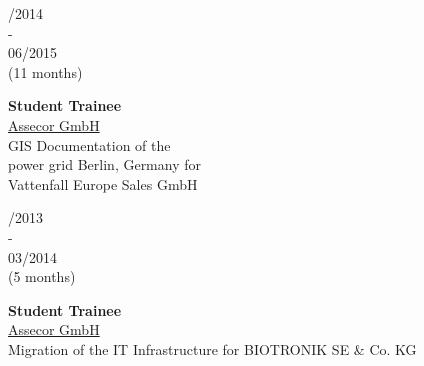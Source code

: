 \documentclass{article}
\begin{document}
\begin{minipage}[t]{0.69\textwidth}
\begin{minipage}{0.34\textwidth}
\begin{minipage}[t]{0.7\textwidth}
\begin{minipage}[t]{0.52\textwidth}
		\vspace{0.2cm}

		
		\begin{minipage}[t]{0.25\textwidth}
		/2014\\ -\\ 06/2015\\(11 months)
		\end{minipage}
		\hfill
		\begin{minipage}[t]{0.75\textwidth}
		\textbf{Student Trainee}\\
		\href{https://assecor.de/}{\color{pblue}Assecor GmbH}\\
	    GIS Documentation of the \\power grid Berlin, Germany for \\Vattenfall Europe Sales GmbH
		\end{minipage}
	
		\vspace{0.2cm}
			
		\begin{minipage}[t]{0.25\textwidth}
		/2013\\ -\\ 03/2014 \\(5 months)
		\end{minipage}
		\hfill
		\begin{minipage}[t]{0.75\textwidth}
		\textbf{Student Trainee}\\
		\href{https://assecor.de/}{\color{pblue}Assecor GmbH}\\
	     Migration of the IT Infrastructure for BIOTRONIK SE \& Co. KG
		\end{minipage}
		
		\vspace{0.3cm}
				

\end{minipage}
\end{minipage}
\end{minipage}
\end{minipage}
\end{document}
